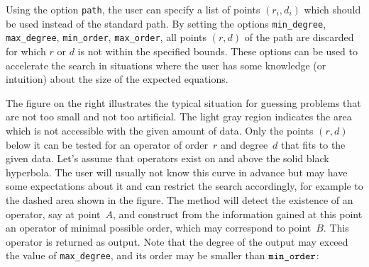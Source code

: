 \documentclass[11pt]{amsart}
\begin{document}
Using the option \verb|path|, the user can specify a list of points $(r_i,d_i)$
which should be used instead of the standard path. By setting the options \verb|min_degree|,
\verb|max_degree|, \verb|min_order|, \verb|max_order|, all points $(r,d)$ of the path
are discarded for which $r$ or $d$ is not within the specified bounds. These options
can be used to accelerate the search in situations where the user has some knowledge
(or intuition) about the size of the expected equations. 

\hangindent=-6.3cm\leavevmode
{}%
The figure on the right illustrates the typical situation for guessing problems
that are not too small and not too artificial. The light gray region indicates
the area which is not accessible with the given amount of data. Only the points
$(r,d)$ below it can be tested for an operator of order~$r$ and degree~$d$ that
fits to the given data. Let's assume that operators exist on and above the solid
black hyperbola. The user will usually not know this curve in advance but may
have some expectations about it and can restrict the search accordingly, for
example to the dashed area shown in the figure. The method will detect the
existence of an operator, say at point~$A$, and construct from the information
gained at this point an operator of minimal possible order, which may correspond
to point~$B$.  This operator is returned as output. Note that the degree of the
output may exceed the value of \verb|max_degree|, and its order may be smaller
than $\verb|min_order|$:
\end{document}
